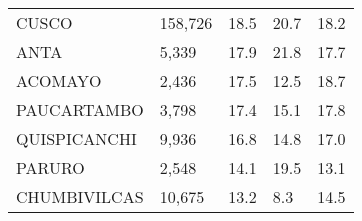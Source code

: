 \begin{tabular}{lllll}
	\cellcolor[HTML]{FF5050}CUSCO                                  & 158,726                                                               & 18.5                                                                             & 20.7                                                                        & 18.2                                                                                \\
	\cellcolor[HTML]{FF5050}ANTA                                   & 5,339                                                                 & 17.9                                                                             & 21.8                                                                        & 17.7                                                                                \\
	\cellcolor[HTML]{FF5050}ACOMAYO                                & 2,436                                                                 & 17.5                                                                             & 12.5                                                                        & 18.7                                                                                \\
	\cellcolor[HTML]{FF5050}PAUCARTAMBO                            & 3,798                                                                 & 17.4                                                                             & 15.1                                                                        & 17.8                                                                                \\
	\cellcolor[HTML]{FF5050}QUISPICANCHI                           & 9,936                                                                 & 16.8                                                                             & 14.8                                                                        & 17.0                                                                                \\
	\cellcolor[HTML]{FF5050}PARURO                                 & 2,548                                                                 & 14.1                                                                             & 19.5                                                                        & 13.1                                                                                \\
	\cellcolor[HTML]{FF5050}CHUMBIVILCAS                           & 10,675                                                                & 13.2                                                                             & 8.3                                                                         & 14.5                                                                                \\

\end{tabular}
